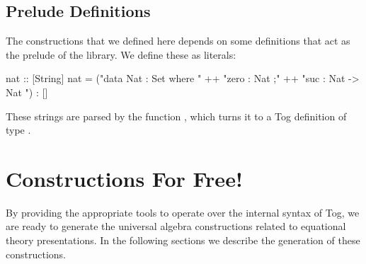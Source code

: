 \begin{comment}
\label{subsec:generation:renaming}
In multiple positions what we do is substitution, i.e. traverse the datatype and replace the occurence of one variable with another. 

\label{subsec:generation:bindings}
Bindings are pervasive in definitions and are so important to deal with. We provide several utility functions for indexing bindings, repeating them, and other basic operations. 
The most interesting of all is the case when the bindings of two different entities need to be combined together, like in the case when both entities are arguments to a function.\ednote{Q: Is there literature on this?}  
\ednote{Q: How useful is the bindings section? Should I keep it?}
\end{comment}

\subsection{Prelude Definitions}
\label{subsec:generation:prelude}
The constructions that we defined here depends on some definitions that act as the prelude of the library. We define these as literals: 
\begin{hscode}
nat :: [String]
nat =
  ("data Nat : Set where { " ++ 
     "zero : Nat ;" ++ 
     "suc  : Nat -> Nat }") : []
\end{hscode}
\noindent These strings are parsed by the function , which turns it to a Tog definition of type . 


\section{Constructions For Free!}
\label{sec:generatedConstructions}
By providing the appropriate tools to operate over the internal syntax of Tog, we are ready to generate the universal algebra constructions related to equational theory presentations. In the following sections we describe the generation of these constructions. 

